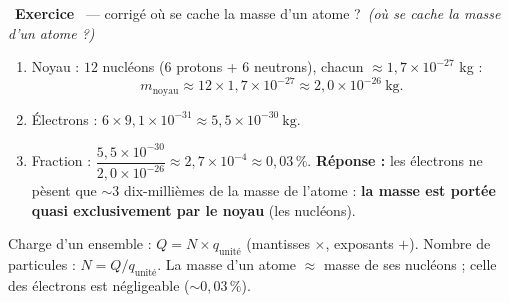 \documentclass[11pt,a4paper]{article}
\newcommand{\rep}{\textbf{\color{excol}Réponse : }}
\newcounter{exo}
\newcommand{\cor}[1][]{\stepcounter{exo}\par\medskip%
  \noindent{\color{primary}\rule[-2pt]{3.5pt}{15pt}}\ \textbf{\color{primarydark}\large Exercice \theexo}%
  \ \textmd{\normalsize\color{black!55}— corrigé}%
  \ifx\relax#1\relax\relax\else\ \textmd{\normalsize\color{black!65}\itshape (#1)}\fi\par\nopagebreak\smallskip}
\begin{document}
\cor[où se cache la masse d'un atome ?]
\begin{enumerate}[label=\alph*)]
  \item Noyau : $12$ nucléons (6 protons + 6 neutrons), chacun $\approx1{,}7\times10^{-27}$ kg :
        \[ m_{\text{noyau}} \approx 12\times1{,}7\times10^{-27} \approx 2{,}0\times10^{-26}\ \text{kg}. \]
  \item Électrons : $6\times9{,}1\times10^{-31} \approx 5{,}5\times10^{-30}\ \text{kg}$.
  \item Fraction : $\dfrac{5{,}5\times10^{-30}}{2{,}0\times10^{-26}} \approx 2{,}7\times10^{-4}
        \approx 0{,}03\,\%$.
        \; \rep les électrons ne pèsent que $\sim3$ dix-millièmes de la masse de l'atome :
        \textbf{la masse est portée quasi exclusivement par le noyau} (les nucléons).
\end{enumerate}

\begin{bilan}
Charge d'un ensemble : $Q = N\times q_{\text{unité}}$ (mantisses $\times$, exposants $+$). Nombre de
particules : $N = Q/q_{\text{unité}}$. La masse d'un atome $\approx$ masse de ses nucléons ; celle des
électrons est négligeable ($\sim0{,}03\,\%$).
\end{bilan}
\end{document}
